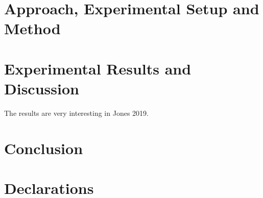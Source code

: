 \documentclass[12pt,twoside]{report}
\begin{document}
\chapter{Approach, 
Experimental Setup and Method}


\chapter{Experimental Results and Discussion}
The results are very interesting in Jones 2019.

\chapter{Conclusion}





\chapter*{Declarations}
\end{document}
